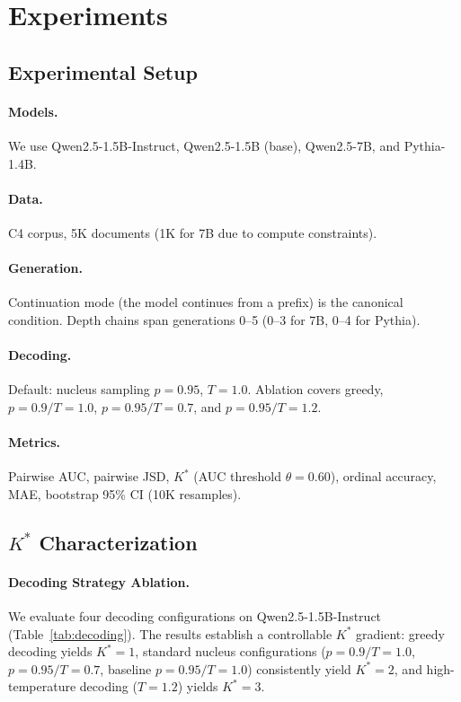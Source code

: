 \documentclass[11pt,a4paper]{article}
\begin{document}
\section{Experiments}

\subsection{Experimental Setup}

\paragraph{Models.} We use Qwen2.5-1.5B-Instruct, Qwen2.5-1.5B (base), Qwen2.5-7B, and Pythia-1.4B.
\paragraph{Data.} C4 corpus, 5K documents (1K for 7B due to compute constraints).
\paragraph{Generation.} Continuation mode (the model continues from a prefix) is the canonical condition. Depth chains span generations 0--5 (0--3 for 7B, 0--4 for Pythia).
\paragraph{Decoding.} Default: nucleus sampling $p=0.95$, $T=1.0$. Ablation covers greedy, $p=0.9/T=1.0$, $p=0.95/T=0.7$, and $p=0.95/T=1.2$.
\paragraph{Metrics.} Pairwise AUC, pairwise JSD, $K^*$ (AUC threshold $\theta=0.60$), ordinal accuracy, MAE, bootstrap 95\% CI (10K resamples).

\subsection{$K^*$ Characterization}
\label{sec:kstar}

\paragraph{Decoding Strategy Ablation.}
We evaluate four decoding configurations on Qwen2.5-1.5B-Instruct (Table~\ref{tab:decoding}).
The results establish a controllable $K^*$ gradient: greedy decoding yields $K^*=1$, standard nucleus configurations ($p=0.9/T=1.0$, $p=0.95/T=0.7$, baseline $p=0.95/T=1.0$) consistently yield $K^*=2$, and high-temperature decoding ($T=1.2$) yields $K^*=3$.
\end{document}
